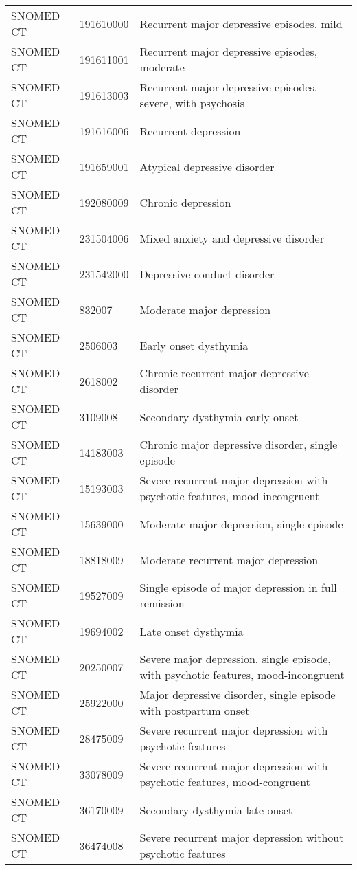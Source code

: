 \begin{longtable}{p{}p{}p{}}
  SNOMED CT & 191610000 & Recurrent major depressive episodes, mild \\ 
  SNOMED CT & 191611001 & Recurrent major depressive episodes, moderate \\ 
  SNOMED CT & 191613003 & Recurrent major depressive episodes, severe, with psychosis \\ 
  SNOMED CT & 191616006 & Recurrent depression \\ 
  SNOMED CT & 191659001 & Atypical depressive disorder \\ 
  SNOMED CT & 192080009 & Chronic depression \\ 
  SNOMED CT & 231504006 & Mixed anxiety and depressive disorder \\ 
  SNOMED CT & 231542000 & Depressive conduct disorder \\ 
  SNOMED CT & 832007 & Moderate major depression \\ 
  SNOMED CT & 2506003 & Early onset dysthymia \\ 
  SNOMED CT & 2618002 & Chronic recurrent major depressive disorder \\ 
  SNOMED CT & 3109008 & Secondary dysthymia early onset \\ 
  SNOMED CT & 14183003 & Chronic major depressive disorder, single episode \\ 
  SNOMED CT & 15193003 & Severe recurrent major depression with psychotic features, mood-incongruent \\ 
  SNOMED CT & 15639000 & Moderate major depression, single episode \\ 
  SNOMED CT & 18818009 & Moderate recurrent major depression \\ 
  SNOMED CT & 19527009 & Single episode of major depression in full remission \\ 
  SNOMED CT & 19694002 & Late onset dysthymia \\ 
  SNOMED CT & 20250007 & Severe major depression, single episode, with psychotic features, mood-incongruent \\ 
  SNOMED CT & 25922000 & Major depressive disorder, single episode with postpartum onset \\ 
  SNOMED CT & 28475009 & Severe recurrent major depression with psychotic features \\ 
  SNOMED CT & 33078009 & Severe recurrent major depression with psychotic features, mood-congruent \\ 
  SNOMED CT & 36170009 & Secondary dysthymia late onset \\ 
  SNOMED CT & 36474008 & Severe recurrent major depression without psychotic features \\ 

\end{longtable}
